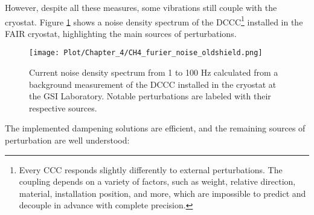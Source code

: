 \documentclass[12pt,a4paper]{report}
\begin{document}
       	However, despite all these measures, some vibrations still couple with the cryostat. Figure \ref{CH4_furier_noise} shows a noise density spectrum of the DCCC\footnote{Every CCC responds slightly differently to external perturbations. The coupling depends on a variety of factors, such as weight, relative direction, material, installation position, and more, which are impossible to predict and decouple in advance with complete precision.} installed in the FAIR cryostat, highlighting the main sources of perturbations.
       	\begin{figure}[H]
       		\centering
       		\texttt{[image: Plot/Chapter\_4/CH4\_furier\_noise\_oldshield.png]}
       		\caption{\small{Current noise density spectrum from 1 to 100 Hz calculated from a background measurement of the DCCC installed in the cryostat at the GSI Laboratory. Notable perturbations are labeled with their respective sources.}}
       		\label{CH4_furier_noise}
       	\end{figure}
       	The implemented dampening solutions are efficient, and the remaining sources of perturbation are well understood:
\end{document}
